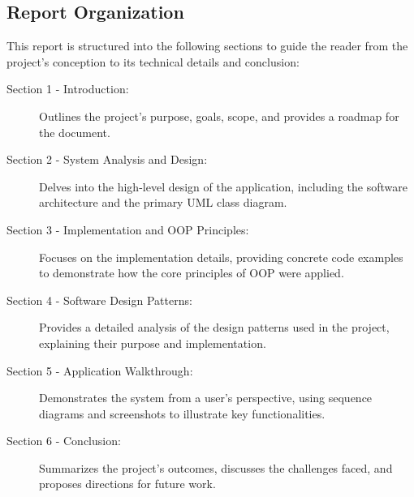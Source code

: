 \subsection{Report Organization}
This report is structured into the following sections to guide the reader from the project's conception to its technical details and conclusion:
\begin{description}
    \item[Section 1 - Introduction:] Outlines the project's purpose, goals, scope, and provides a roadmap for the document.
    \item[Section 2 - System Analysis and Design:] Delves into the high-level design of the application, including the software architecture and the primary UML class diagram.
    \item[Section 3 - Implementation and OOP Principles:] Focuses on the implementation details, providing concrete code examples to demonstrate how the core principles of OOP were applied.
    \item[Section 4 - Software Design Patterns:] Provides a detailed analysis of the design patterns used in the project, explaining their purpose and implementation.
    \item[Section 5 - Application Walkthrough:] Demonstrates the system from a user's perspective, using sequence diagrams and screenshots to illustrate key functionalities.
    \item[Section 6 - Conclusion:] Summarizes the project's outcomes, discusses the challenges faced, and proposes directions for future work.
\end{description}